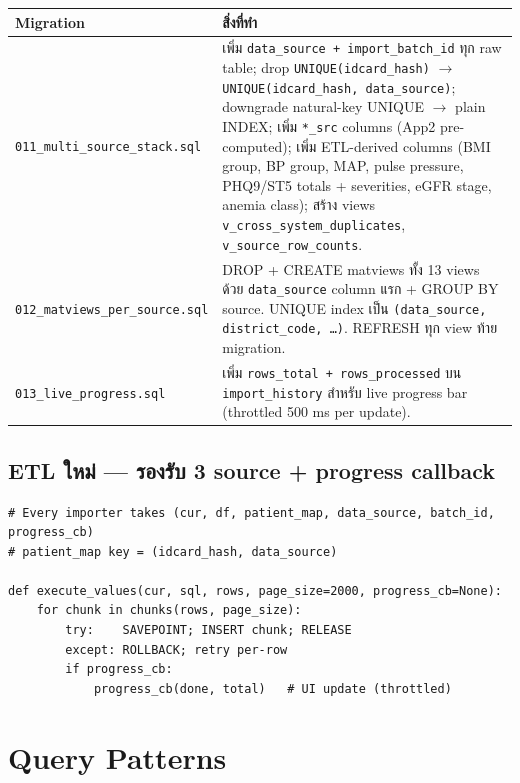 \documentclass[11pt,a4paper]{article}
\begin{document}
\begin{center}
\footnotesize
\begin{tabularx}{\linewidth}{l X}
\toprule
\textbf{Migration} & \textbf{สิ่งที่ทำ} \\
\midrule
\texttt{011\_multi\_source\_stack.sql}
    & เพิ่ม \texttt{data\_source + import\_batch\_id} ทุก raw table;
      drop \texttt{UNIQUE(idcard\_hash)} $\rightarrow$ \texttt{UNIQUE(idcard\_hash, data\_source)};
      downgrade natural-key UNIQUE $\rightarrow$ plain INDEX;
      เพิ่ม \texttt{*\_src} columns (App2 pre-computed);
      เพิ่ม ETL-derived columns (BMI group, BP group, MAP, pulse pressure,
      PHQ9/ST5 totals + severities, eGFR stage, anemia class);
      สร้าง views \texttt{v\_cross\_system\_duplicates}, \texttt{v\_source\_row\_counts}. \\
\addlinespace
\texttt{012\_matviews\_per\_source.sql}
    & DROP + CREATE matviews ทั้ง 13 views ด้วย \texttt{data\_source} column แรก
      + GROUP BY source. UNIQUE index เป็น \texttt{(data\_source, district\_code, \ldots)}.
      REFRESH ทุก view ท้าย migration. \\
\addlinespace
\texttt{013\_live\_progress.sql}
    & เพิ่ม \texttt{rows\_total + rows\_processed} บน \texttt{import\_history}
      สำหรับ live progress bar (throttled 500 ms per update). \\
\bottomrule
\end{tabularx}
\end{center}

\subsection{ETL ใหม่ --- รองรับ 3 source + progress callback}

\begin{lstlisting}[style=pythonstyle]
# Every importer takes (cur, df, patient_map, data_source, batch_id, progress_cb)
# patient_map key = (idcard_hash, data_source)

def execute_values(cur, sql, rows, page_size=2000, progress_cb=None):
    for chunk in chunks(rows, page_size):
        try:    SAVEPOINT; INSERT chunk; RELEASE
        except: ROLLBACK; retry per-row
        if progress_cb:
            progress_cb(done, total)   # UI update (throttled)
\end{lstlisting}

\section{Query Patterns}
\end{document}
